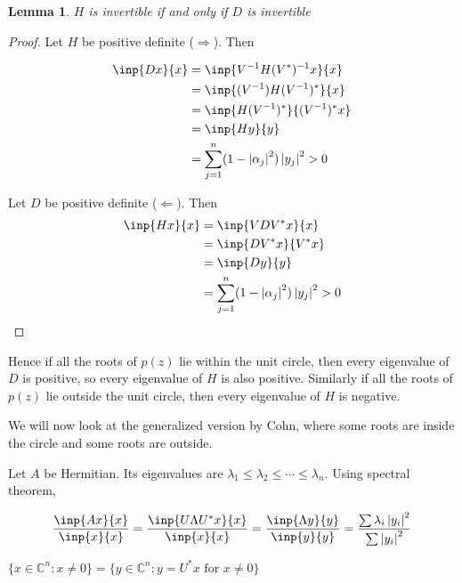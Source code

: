\documentclass[twofold]{article}
\newcommand*\adj[1]{#1^*}
\newcommand*\abs[1]{\left \vert #1 \right\vert}
\theoremstyle{plain}
\newtheorem*{lemma}{Lemma}
\theoremstyle{definition}
\theoremstyle{remark}
\begin{document}
\begin{lemma} \(H\) is invertible if and only if \(D\) is invertible \end{lemma}
\begin{proof}

Let \(H\) be positive definite (\(\Rightarrow\)). Then

\begin{equation*} \begin{split}
\inp{Dx}{x} & = \inp{V^{-1} H (\adj{V}) ^{-1}x}{x} \\
& = \inp{(V^{-1}) H \adj{(V^{-1})}}{x} \\
& = \inp{ H \adj{(V^{-1})}}{ \adj{(V^{-1})}x}\\
& = \inp{Hy}{y} \\
& = \sum_{j =1}^n (1 - \abs{\alpha_j}^2) \abs{y_j}^2 > 0\\
\end{split} \end{equation*} 


Let \(D\) be positive definite (\(\Leftarrow\)). Then 
\begin{equation*}\begin{split}
\inp{Hx}{x} & = \inp{VD\adj{V} x}{x} \\
& = \inp{D\adj{V} x}{\adj{V}x} \\
& = \inp{Dy}{y} \\
& = \sum_{j =1}^n (1 - \abs{\alpha_j}^2) \abs{y_j}^2 > 0
\end{split} \end{equation*}

\end{proof}

Hence if all the roots of \(p(z)\) lie within the unit circle, then every eigenvalue of \(D\) is positive, so every eigenvalue of \(H\) is also positive. 
Similarly if all the roots of \(p(z)\) lie outside the unit circle, then every eigenvalue of \(H\) is negative. 

We will now look at the generalized version by Cohn, where some roots are inside the circle and some roots are outside.

Let \(A\) be Hermitian. Its eigenvalues are \(\lambda_1 \le \lambda_2 \le \cdots \le \lambda_n\). Using spectral theorem, 

\[\frac{\inp{Ax}{x}}{\inp{x}{x}}  = \frac{\inp{U\Lambda \adj{U}x}{x}}{\inp{x}{x}} = \frac{\inp{\Lambda y}{y}}{\inp{y}{y}} = \frac{\sum \lambda_i \abs{y_i}^2}{\sum \abs{y_i}^2}\]

\(\{x \in \mathbb{C}^n : x \ne 0\} = \{y \in \mathbb{C}^n : y = \adj{U} x \text{ for } x \ne 0 \} \) 
\end{document}
